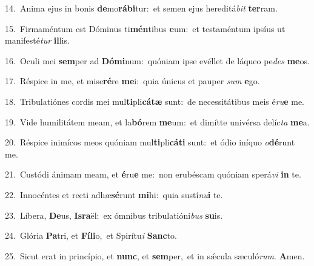 {\numbfont\textcolor{\numbcolor}{14.}}~Anima ejus in bonis \textbf{de}\-mo\-\textbf{rá}\-\textbf{bi}tur:~\star et semen ejus hereditá\textit{bit} \textbf{ter}\-ram.\par
{\numbfont\textcolor{\numbcolor}{15.}}~Firmaméntum est Dóminus ti\-\textbf{mén}\-tibus \textbf{e}\-um:~\star et testaméntum ipsíus ut manifesté\textit{tur} \textbf{il}\-lis.\par
{\numbfont\textcolor{\numbcolor}{16.}}~Oculi mei \textbf{sem}\-per ad \textbf{Dó}\-\textbf{mi}num:~\star quóniam ipse evéllet de láqueo pe\textit{des} \textbf{me}\-os.\par
{\numbfont\textcolor{\numbcolor}{17.}}~Réspice in me, et mise\-\textbf{ré}\-re \textbf{me}\-i:~\star quia únicus et pauper \textit{sum} \textbf{e}\-go.\par
{\numbfont\textcolor{\numbcolor}{18.}}~Tribulatiónes cordis mei mul\-\textbf{ti}\-pli\-\textbf{cá}\-\textbf{tæ} sunt:~\star de necessitátibus meis é\-\textit{ru}\-\textbf{e} me.\par
{\numbfont\textcolor{\numbcolor}{19.}}~Vide humilitátem meam, et la\-\textbf{bó}\-rem \textbf{me}\-um:~\star et dimítte univérsa delíc\textit{ta} \textbf{me}\-a.\par
{\numbfont\textcolor{\numbcolor}{20.}}~Réspice inimícos meos quóniam mul\-\textbf{ti}\-pli\-\textbf{cá}\-\textbf{ti} sunt:~\star et ódio iníquo \textit{o}\-\textbf{dé}runt me.\par
{\numbfont\textcolor{\numbcolor}{21.}}~Custódi ánimam meam, et \textbf{é}\-ru\textbf{e} me:~\star non erubéscam quóniam sperá\textit{vi} \textbf{in} te.\par
{\numbfont\textcolor{\numbcolor}{22.}}~Innocéntes et recti adhæ\-\textbf{sé}\-runt \textbf{mi}\-hi:~\star quia sustí\-\textit{nu}\-\textbf{i} te.\par
{\numbfont\textcolor{\numbcolor}{23.}}~Líbera, \textbf{De}\-us, \textbf{Is}\-\textbf{ra}ël:~\star ex ómnibus tribulatióni\textit{bus} \textbf{su}\-is.\par
{\numbfont\textcolor{\numbcolor}{24.}}~Glória \textbf{Pa}\-tri, et \textbf{Fí}\-\textbf{li}o,~\star et Spirítu\textit{i} \textbf{Sanc}\-to.\par
{\numbfont\textcolor{\numbcolor}{25.}}~Sicut erat in princípio, et \textbf{nunc}\-, et \textbf{sem}\-per,~\star et in sǽcula sæculó\-\textit{rum}\-. \textbf{A}\-men.\par
